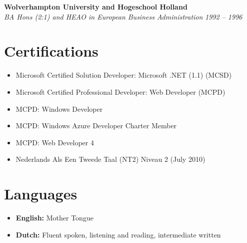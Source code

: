\documentclass[11pt,a4paper]{article}
\begin{document}
\textbf{Wolverhampton University and Hogeschool Holland}\\
\textit{BA Hons (2:1) and HEAO in European Business Administration} \hfill \textit{1992 -- 1996}

\section{Certifications}
\begin{itemize}[leftmargin=*]
    \item Microsoft Certified Solution Developer: Microsoft .NET (1.1) (MCSD)
    \item Microsoft Certified Professional Developer: Web Developer (MCPD)
    \item MCPD: Windows Developer
    \item MCPD: Windows Azure Developer Charter Member
    \item MCPD: Web Developer 4
    \item Nederlands Als Een Tweede Taal (NT2) Niveau 2 (July 2010)
\end{itemize}

\section{Languages}
\begin{itemize}[leftmargin=*]
    \item \textbf{English:} Mother Tongue
    \item \textbf{Dutch:} Fluent spoken, listening and reading, intermediate written
\end{itemize}
\end{document}
